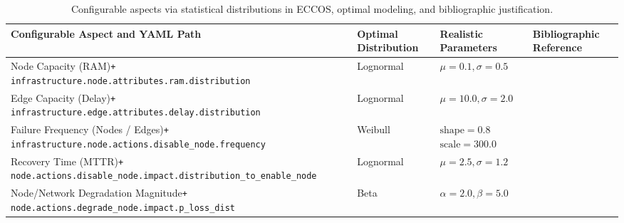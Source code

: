 \documentclass[ASNA]{USG} %
\begin{document}
\begin{table}[!ht]
\caption{Configurable aspects via statistical distributions in ECCOS, optimal modeling, and bibliographic justification.}
\label{tab:configurable_distributions}
\begin{tabular*}{\textwidth}{@{\extracolsep\fill}p{6.2cm} p{2.2cm} p{2.8cm} p{2.5cm}@{\extracolsep\fill}}
\toprule
\textbf{Configurable Aspect and YAML Path} & \textbf{Optimal Distribution} & \textbf{Realistic Parameters} & \textbf{Bibliographic Reference} \\
\midrule

Node Capacity (RAM)\newline \texttt{+ infrastructure.node.attributes.ram.distribution} & Lognormal & $\mu=0.1, \sigma=0.5$ & \cite{10.1145/2391229.2391236} \\
\midrule
Edge Capacity (Delay)\newline \texttt{+ infrastructure.edge.attributes.delay.distribution} & Lognormal & $\mu=10.0, \sigma=2.0$ & \cite{10.1145/1879141.1879175} \\
\midrule
Failure Frequency (Nodes / Edges)\newline \texttt{+ infrastructure.node.actions.disable\_node.frequency} & Weibull & $\text{shape}=0.8$ \newline $\text{scale}=300.0$ & \cite{Schroeder_2007} \\
\midrule
Recovery Time (MTTR)\newline \texttt{+ node.actions.disable\_node.impact.distribution\_to\_enable\_node} & Lognormal & $\mu=2.5, \sigma=1.2$ & \cite{Schroeder_2007}\\
\midrule
Node/Network Degradation Magnitude\newline \texttt{+ node.actions.degrade\_node.impact.p\_loss\_dist} & Beta & $\alpha=2.0, \beta=5.0$ & \cite{10.1145/2885497} \\


\end{tabular*}
\end{table}
\end{document}
